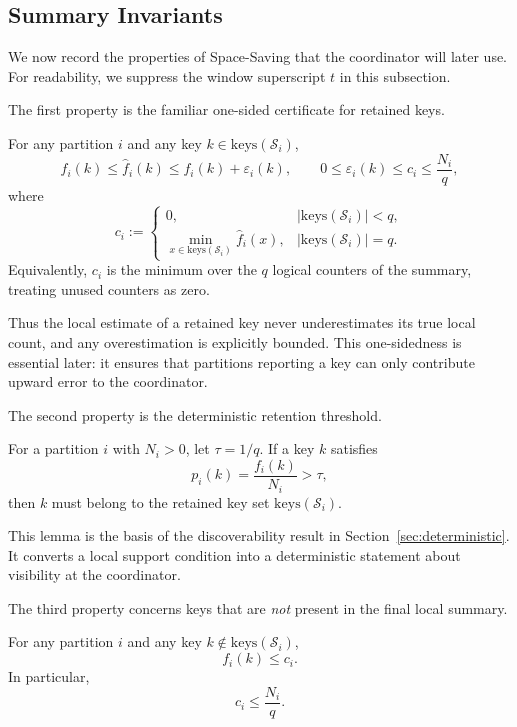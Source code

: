 \documentclass[sigconf, nonacm]{acmart}
\begin{document}
\subsection{Summary Invariants}
\label{subsec:ss-invariants}

We now record the properties of Space-Saving that the coordinator will later use. For readability, we suppress the window superscript \(t\) in this subsection.

The first property is the familiar one-sided certificate for retained keys.

\begin{lemma}
\label{lem:ss-certificate}
For any partition \(i\) and any key \(k \in \mathrm{keys}(\mathcal{S}_i)\),
\[
f_i(k) \le \hat f_i(k) \le f_i(k)+\varepsilon_i(k),
\qquad
0 \le \varepsilon_i(k) \le c_i \le \frac{N_i}{q},
\]
where
\[
c_i :=
\begin{cases}
0, & |\mathrm{keys}(\mathcal S_i)| < q,\\[0.75ex]
\min_{x \in \mathrm{keys}(\mathcal{S}_i)} \hat f_i(x), & |\mathrm{keys}(\mathcal S_i)| = q.
\end{cases}
\]
Equivalently, \(c_i\) is the minimum over the \(q\) logical counters of the summary, treating unused counters as zero.
\end{lemma}

Thus the local estimate of a retained key never underestimates its true local count, and any overestimation is explicitly bounded. This one-sidedness is essential later: it ensures that partitions reporting a key can only contribute upward error to the coordinator.

The second property is the deterministic retention threshold.

\begin{lemma}
\label{lem:ss-retention}
For a partition \(i\) with \(N_i>0\), let \(\tau = 1/q\). If a key \(k\) satisfies
\[
p_i(k)=\frac{f_i(k)}{N_i}>\tau,
\]
then \(k\) must belong to the retained key set \(\mathrm{keys}(\mathcal{S}_i)\).
\end{lemma}

This lemma is the basis of the discoverability result in Section~\ref{sec:deterministic}. It converts a local support condition into a deterministic statement about visibility at the coordinator.

The third property concerns keys that are \emph{not} present in the final local summary.

\begin{lemma}
\label{lem:ss-mincounter}
For any partition \(i\) and any key \(k \notin \mathrm{keys}(\mathcal{S}_i)\),
\[
f_i(k) \le c_i.
\]
In particular,
\[
c_i \le \frac{N_i}{q}.
\]
\end{lemma}
\end{document}
